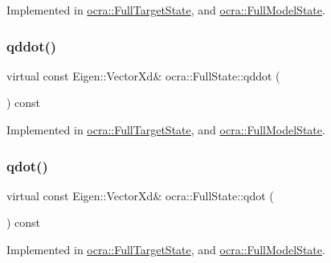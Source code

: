 Implemented in \hyperlink{classocra_1_1FullTargetState_a0f246232828d53c497924b95d2b97004}{ocra\+::\+Full\+Target\+State}, and \hyperlink{classocra_1_1FullModelState_a3a560064b1be8bd1579382aa08686904}{ocra\+::\+Full\+Model\+State}.

\hypertarget{classocra_1_1FullState_a5882a53273cd9d3baae36b5850deadae}{}\label{classocra_1_1FullState_a5882a53273cd9d3baae36b5850deadae} 
\subsubsection{\texorpdfstring{qddot()}{qddot()}}
{\footnotesize\ttfamily virtual const Eigen\+::\+Vector\+Xd\& ocra\+::\+Full\+State\+::qddot (\begin{DoxyParamCaption}{ }\end{DoxyParamCaption}) const\hspace{0.3cm}{\ttfamily [pure virtual]}}



Implemented in \hyperlink{classocra_1_1FullTargetState_a1436b42b01d2857e4dc5c53a233f0e69}{ocra\+::\+Full\+Target\+State}, and \hyperlink{classocra_1_1FullModelState_a2578e15742268c14fb4ce5f26033256e}{ocra\+::\+Full\+Model\+State}.

\hypertarget{classocra_1_1FullState_a7018fe03dc3c8b3ec95d3c2015ae60e6}{}\label{classocra_1_1FullState_a7018fe03dc3c8b3ec95d3c2015ae60e6} 
\subsubsection{\texorpdfstring{qdot()}{qdot()}}
{\footnotesize\ttfamily virtual const Eigen\+::\+Vector\+Xd\& ocra\+::\+Full\+State\+::qdot (\begin{DoxyParamCaption}{ }\end{DoxyParamCaption}) const\hspace{0.3cm}{\ttfamily [pure virtual]}}



Implemented in \hyperlink{classocra_1_1FullTargetState_a2ada581270803a39e8c690f8c9354644}{ocra\+::\+Full\+Target\+State}, and \hyperlink{classocra_1_1FullModelState_a034c567bae39a29f391f6462f52b0834}{ocra\+::\+Full\+Model\+State}.

\hypertarget{classocra_1_1FullState_a24723b4a382c2bf51e6c32cbd1bd7b06}{}\label{classocra_1_1FullState_a24723b4a382c2bf51e6c32cbd1bd7b06} 
